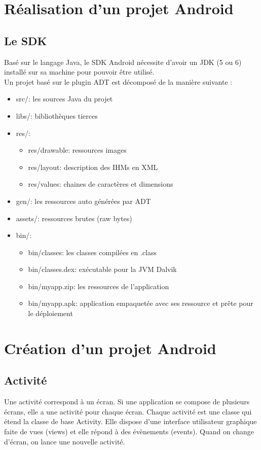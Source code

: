 \documentclass[a4paper]{report}
\begin{document}
	\section{Réalisation d’un projet Android}
		\subsection{Le SDK}
			Basé sur le langage Java, le SDK Android nécessite d'avoir un JDK (5 ou 6) installé sur sa machine pour pouvoir être utilisé.\\

			Un projet basé sur le plugin ADT est décomposé de la manière suivante :\\
			
			\begin{itemize}
			    	\item src/: les sources Java du projet
			    	\item libs/: bibliothèques tierces
			    	\item res/:
				\begin{itemize}
					\item res/drawable: ressources images
					\item res/layout: description des IHMs en XML
					\item res/values: chaines de caractères et dimensions
				\end{itemize}
			    	\item gen/: les ressources auto générées par ADT
			    	\item assets/: ressources brutes (raw bytes)
			    	\item bin/:
				\begin{itemize}
					\item bin/classes: les classes compilées en .class
					\item bin/classes.dex: exécutable pour la JVM Dalvik
					\item bin/myapp.zip: les ressources de l'application
					\item bin/myapp.apk: application empaquetée avec ses ressource et prête pour le déploiement		
				\end{itemize}
			\end{itemize}

	\section{Création d’un projet Android}
		\subsection{Activité}
			Une activité correspond à un écran. Si une application se compose de plusieurs écrans, elle a une activité pour chaque écran. Chaque activité est une classe qui étend la classe 				de base Activity. Elle dispose d'une interface utilisateur graphique faite de vues (views) et elle répond à des évènements (events). Quand on change d'écran, on lance une 				nouvelle activité.\\
\end{document}
